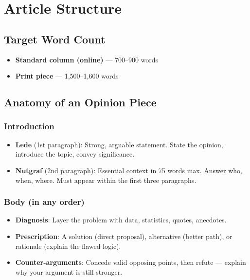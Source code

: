 \documentclass[12pt]{article}
\begin{document}
\section{Article Structure}

\subsection{Target Word Count}

\begin{itemize}
    \item \textbf{Standard column (online)} --- 700--900 words
    \item \textbf{Print piece} --- 1,500--1,600 words
\end{itemize}

\subsection{Anatomy of an Opinion Piece}

\subsubsection{Introduction}
\begin{itemize}
    \item \textbf{Lede} (1st paragraph): Strong, arguable statement. State the opinion, introduce the topic, convey significance.
    \item \textbf{Nutgraf} (2nd paragraph): Essential context in 75 words max. Answer who, when, where. Must appear within the first three paragraphs.
\end{itemize}

\subsubsection{Body (in any order)}
\begin{itemize}
    \item \textbf{Diagnosis}: Layer the problem with data, statistics, quotes, anecdotes.
    \item \textbf{Prescription}: A solution (direct proposal), alternative (better path), or rationale (explain the flawed logic).
    \item \textbf{Counter-arguments}: Concede valid opposing points, then refute --- explain why your argument is still stronger.
\end{itemize}
\end{document}
